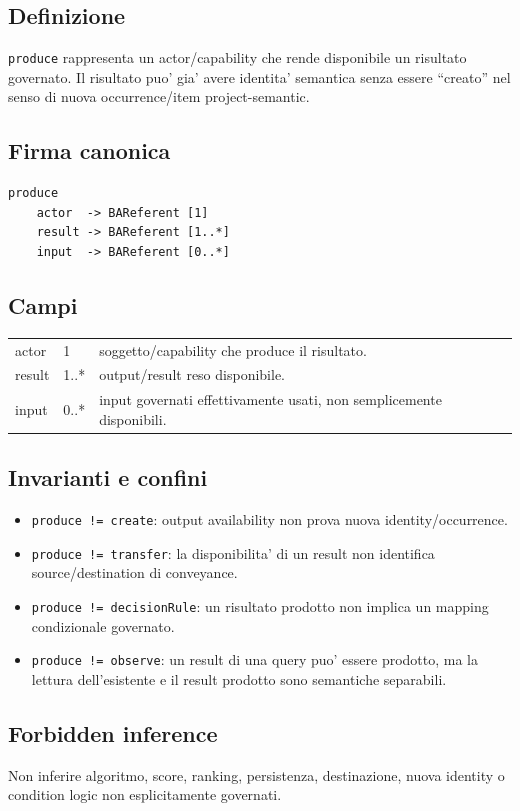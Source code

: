 \documentclass[11pt,a4paper]{article}
\begin{document}
\subsection{Definizione}
\texttt{produce} rappresenta un actor/capability che rende disponibile un risultato governato. Il risultato puo' gia' avere identita' semantica senza essere ``creato'' nel senso di nuova occurrence/item project-semantic.

\subsection{Firma canonica}
\begin{lstlisting}
produce
    actor  -> BAReferent [1]
    result -> BAReferent [1..*]
    input  -> BAReferent [0..*]
\end{lstlisting}

\subsection{Campi}
\begin{tabularx}{\textwidth}{L{36mm}L{24mm}Y}
\toprule
actor & 1 & soggetto/capability che produce il risultato. \\
result & 1..* & output/result reso disponibile. \\
input & 0..* & input governati effettivamente usati, non semplicemente disponibili. \\
\bottomrule
\end{tabularx}

\subsection{Invarianti e confini}
\begin{itemize}
  \item \texttt{produce != create}: output availability non prova nuova identity/occurrence.
  \item \texttt{produce != transfer}: la disponibilita' di un result non identifica source/destination di conveyance.
  \item \texttt{produce != decisionRule}: un risultato prodotto non implica un mapping condizionale governato.
  \item \texttt{produce != observe}: un result di una query puo' essere prodotto, ma la lettura dell'esistente e il result prodotto sono semantiche separabili.
\end{itemize}

\subsection{Forbidden inference}
Non inferire algoritmo, score, ranking, persistenza, destinazione, nuova identity o condition logic non esplicitamente governati.
\end{document}
